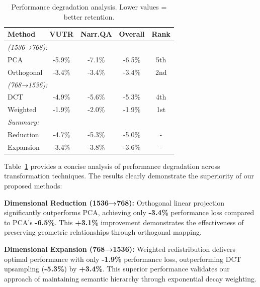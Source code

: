 \documentclass[10pt,twocolumn,letterpaper]{article}
\begin{document}
\begin{table}[!ht]
\caption{Performance degradation analysis. Lower values = better retention.}
\centering
\begin{tabular}{lcccc}
\toprule
\textbf{Method} & \textbf{VUTR} & \textbf{Narr.QA} & \textbf{Overall} & \textbf{Rank} \\
\midrule
\multicolumn{5}{l}{\textit{(1536→768):}} \\
PCA & -5.9\% & -7.1\% & -6.5\% & 5th \\
Orthogonal & -3.4\% & -3.4\% & -3.4\% & 2nd \\
\midrule
\multicolumn{5}{l}{\textit{(768→1536):}} \\
DCT & -4.9\% & -5.6\% & -5.3\% & 4th \\
Weighted & -1.9\% & -2.0\% & -1.9\% & 1st \\
\midrule
\multicolumn{5}{l}{\textit{Summary:}} \\
Reduction & -4.7\% & -5.3\% & -5.0\% & - \\
Expansion & -3.4\% & -3.8\% & -3.6\% & - \\
\bottomrule
\end{tabular}
\label{tab:degradation_summary}
\end{table}

Table~\ref{tab:degradation_summary} provides a concise analysis of performance degradation across transformation techniques. The results clearly demonstrate the superiority of our proposed methods:

\textbf{Dimensional Reduction (1536→768):} Orthogonal linear projection significantly outperforms PCA, achieving only \textbf{-3.4\%} performance loss compared to PCA's \textbf{-6.5\%}. This \textbf{+3.1\%} improvement demonstrates the effectiveness of preserving geometric relationships through orthogonal mapping.

\vspace{0.5em}
\textbf{Dimensional Expansion (768→1536):} Weighted redistribution delivers optimal performance with only \textbf{-1.9\%} performance loss, outperforming DCT upsampling (\textbf{-5.3\%}) by \textbf{+3.4\%}. This superior performance validates our approach of maintaining semantic hierarchy through exponential decay weighting.
\end{document}
